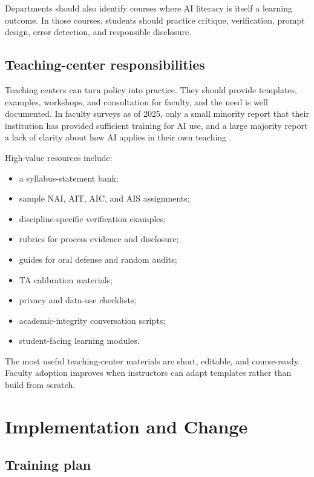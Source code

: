 \documentclass{SIAMbook2023}
\begin{document}
Departments should also identify courses where AI literacy is itself a learning outcome. In those courses, students should practice critique, verification, prompt design, error detection, and responsible disclosure.

\section{Teaching-center responsibilities}
\label{u:sec:teaching-center}%

Teaching centers can turn policy into practice. They should provide templates, examples, workshops, and consultation for faculty, and the need is well documented. In faculty surveys as of 2025, only a small minority report that their institution has provided sufficient training for AI use, and a large majority report a lack of clarity about how AI applies in their own teaching \citep{digitaleducationcouncil2025faculty}.

High-value resources include:

\begin{itemize}
  \item a syllabus-statement bank;
  \item sample NAI, AIT, AIC, and AIS assignments;
  \item discipline-specific verification examples;
  \item rubrics for process evidence and disclosure;
  \item guides for oral defense and random audits;
  \item TA calibration materials;
  \item privacy and data-use checklists;
  \item academic-integrity conversation scripts;
  \item student-facing learning modules.
\end{itemize}

The most useful teaching-center materials are short, editable, and course-ready. Faculty adoption improves when instructors can adapt templates rather than build from scratch.

\chapter{Implementation and Change}
\label{u:ch:implementation-and-change}%

\section{Training plan}
\label{u:sec:training}%
\end{document}

